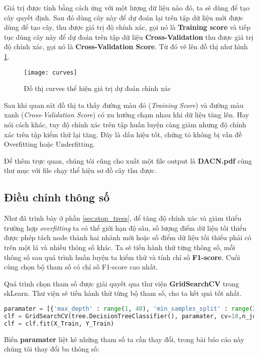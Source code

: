 \documentclass[../main-report.tex]{subfiles}
\begin{document}
Giá trị được tính bằng cách ứng với một lượng dữ liệu nào đó, ta sẽ dùng để tạo cây quyết định. Sau đó dùng cây này để dự đoán lại trên tập dữ liệu mới được dùng để tạo cây, thu được giá trị độ chính xác, gọi nó là \textbf{Training score} và tiếp tục dùng cây này để dự đoán trên tập dữ liệu \textbf{Cross-Validation} thu được giá trị độ chính xác, gọi nó là \textbf{Cross-Validation Score}. Từ đó vẽ lên đồ thị như hình \ref{fig:res_curves}.

\begin{figure}[ht!]
\centering\texttt{[image: curves]}
\caption{Đồ thị curves thể hiện giá trị dự đoán chính xác}
\label{fig:res_curves}
\end{figure}

Sau khi quan sát đồ thị ta thấy đường màu đỏ (\emph{Training Score}) và đường màu xanh (\emph{Cross-Validation Score}) có xu hướng chạm nhau khi dữ liệu tăng lên. Hay nói cách khác, tuy độ chính xác trên tập huấn luyện càng giảm nhưng độ chính xác trên tập kiểm thử lại tăng. Đây là dấu hiệu tốt, chứng tỏ không bị vấn đề Overfitting hoặc Underfitting.

Để thêm trực quan, chúng tôi cũng cho xuất một file output là \textbf{DACN.pdf} cùng thư mục với file chạy thể hiện sơ đồ cây thu được.
\subsection{Điều chỉnh thông số}
Như đã trình bày ở phần \ref{sec:stop_trees}, để tăng độ chính xác và giảm thiểu trường hợp \emph{overfitting} ta có thể giới hạn độ sâu, số lượng điểm dữ liệu tối thiểu được phép tách node thành hai nhánh mới hoặc số điểm dữ liệu tối thiểu phải có trên một lá và nhiều thông số khác. Ta sẽ tiến hành thử từng thông số, mỗi thông số sau quá trình huấn luyện ta kiểm thử và tính chỉ số \textbf{F1-score}. Cuối cùng chọn bộ tham số có chỉ số F1-score cao nhất.

Quá trình chọn tham số được giải quyết qua thư viện \textbf{GridSearchCV} trong skLearn. Thư viện sẽ tiến hành thử từng bộ tham số, cho ta kết quả tốt nhất.

\begin{lstlisting}[language=Python]
paramater = [{'max_depth' : range(1, 40), 'min_samples_split' : range(2,50), 'min_samples_leaf' : range(1,10)}]
clf = GridSearchCV(tree.DecisionTreeClassifier(), paramater, cv=10,n_jobs=6)
clf = clf.fit(X_Train, Y_Train)
\end{lstlisting}

Biến \textbf{paramater} liệt kê những tham số ta cần thay đổi, trong bài báo cáo này chúng tôi thay đổi ba thông số:
\end{document}
